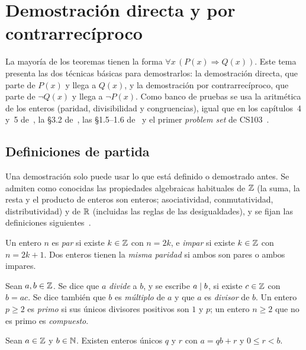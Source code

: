\chapter{Demostración directa y por contrarrecíproco}
\label{tema:3}

La mayoría de los teoremas tienen la forma $\forall x\,(P(x)\Rightarrow Q(x))$. Este tema presenta las dos técnicas básicas para demostrarlos: la demostración directa, que parte de $P(x)$ y llega a $Q(x)$, y la demostración por contrarrecíproco, que parte de $\neg Q(x)$ y llega a $\neg P(x)$. Como banco de pruebas se usa la aritmética de los enteros (paridad, divisibilidad y congruencias), igual que en los capítulos~4 y~5 de~\cite{hammack}, la §3.2 de~\cite{velleman}, las §1.5–1.6 de~\cite{mcs} y el primer \emph{problem set} de CS103~\cite{cs103}.

\section{Definiciones de partida}

Una demostración solo puede usar lo que está definido o demostrado antes. Se admiten como conocidas las propiedades algebraicas habituales de $\mathbb{Z}$ (la suma, la resta y el producto de enteros son enteros; asociatividad, conmutatividad, distributividad) y de $\mathbb{R}$ (incluidas las reglas de las desigualdades), y se fijan las definiciones siguientes~\cite[§4.2]{hammack}.

\begin{definicion}[Paridad]\label{def:paridad}
Un entero $n$ es \emph{par} si existe $k\in\mathbb{Z}$ con $n=2k$, e \emph{impar} si existe $k\in\mathbb{Z}$ con $n=2k+1$. Dos enteros tienen la \emph{misma paridad} si ambos son pares o ambos impares.
\end{definicion}

\begin{definicion}[Divisibilidad]\label{def:divide}
Sean $a,b\in\mathbb{Z}$. Se dice que $a$ \emph{divide} a $b$, y se escribe $a\mid b$, si existe $c\in\mathbb{Z}$ con $b=ac$. Se dice también que $b$ es \emph{múltiplo} de $a$ y que $a$ es \emph{divisor} de $b$. Un entero $p\ge 2$ es \emph{primo} si sus únicos divisores positivos son $1$ y $p$; un entero $n\ge 2$ que no es primo es \emph{compuesto}.
\end{definicion}

\begin{teorema}\label{teo:division}
Sean $a\in\mathbb{Z}$ y $b\in\mathbb{N}$. Existen enteros únicos $q$ y $r$ con $a=qb+r$ y $0\le r<b$.
\end{teorema}

